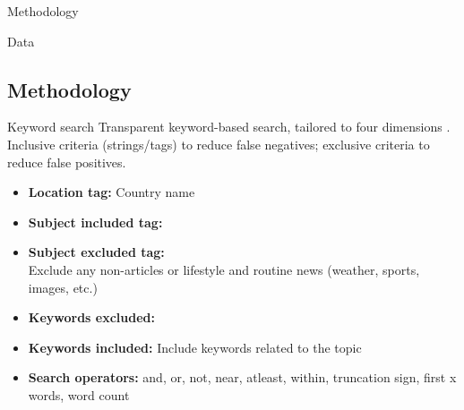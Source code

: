\documentclass[aspectratio=169,10pt]{beamer}
\begin{document}
\begin{section}[Methodology]{Methodology}
\begin{frame}{Data}
\end{frame}

\section{Methodology}\label{methodology_PI}


\begin{frame}{Keyword search}\label{keywords_search} 
\small
Transparent keyword-based search, tailored to four dimensions \citep{JONGAPIN2009}. Inclusive criteria (strings/tags) to reduce false negatives; exclusive criteria to reduce false positives.
\begin{itemize}
    \item \textbf{Location tag:} Country name
    \item \textbf{Subject included tag:}
        \item \textbf{Subject excluded tag:} \\
        {\scriptsize Exclude any non-articles or lifestyle and routine news (weather, sports, images, etc.)
        }
        \item \textbf{Keywords excluded:} 
        \item \textbf{Keywords included:} Include keywords related to the topic
        \item \textbf{Search operators:} and, or, not, near, atleast, within, truncation sign, first x words, word count
    \end{itemize}


\end{frame}
\end{section}
\end{document}
